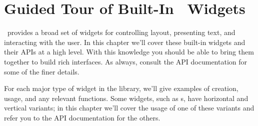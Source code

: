 \chapter{Guided Tour of Built-In \vtyui\ Widgets}
\label{chap:guided_tour}

\vtyui\ provides a broad set of widgets for controlling layout,
presenting text, and interacting with the user.  In this chapter we'll
cover these built-in widgets and their APIs at a high level.  With
this knowledge you should be able to bring them together to build rich
interfaces.  As always, consult the API documentation for some of the
finer details.

For each major type of widget in the library, we'll give examples of
creation, usage, and any relevant functions.  Some widgets, such as
s, have horizontal and vertical variants; in this chapter
we'll cover the usage of one of these variants and refer you to the
API documentation for the others.


















